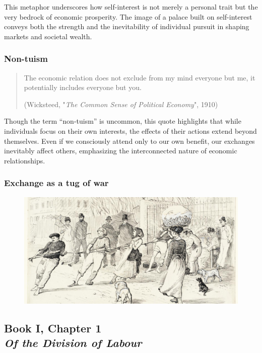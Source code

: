             This metaphor underscores how self-interest is not merely a personal trait but the very bedrock of economic prosperity. The image of a palace built on self-interest conveys both the strength and the inevitability of individual pursuit in shaping markets and societal wealth.

        \subsubsection{Non-tuism}

            \begin{quote}
                The economic relation does not exclude from my mind everyone but me, it potentially includes everyone but you.
                
                (Wicksteed, "\textit{The Common Sense of Political Economy}", 1910)
            \end{quote}

            Though the term “non-tuism” is uncommon, this quote highlights that while individuals focus on their own interests, the effects of their actions extend beyond themselves. Even if we consciously attend only to our own benefit, our exchanges inevitably affect others, emphasizing the interconnected nature of economic relationships.

        \subsubsection{Exchange as a tug of war}

            \begin{figure}[h]
                \centering
                \includegraphics[width=0.5\linewidth]{Images/L6-1.png}
                \label{fig:L6-1}
            \end{figure}

    \subsection[Of the Division of Labour]{Book I, Chapter 1\\
                \textit{Of the Division of Labour}}

